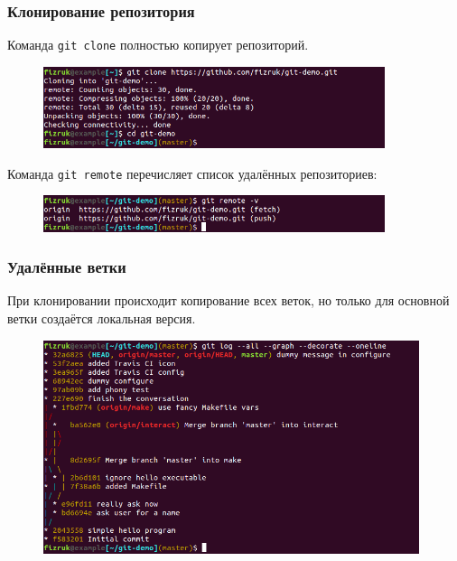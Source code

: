 \documentclass{beamer}
\begin{document}
\begin{frame}
  \frametitle{Клонирование репозитория}
  Команда \texttt{git clone} полностью копирует репозиторий.

  \begin{figure}
    \includegraphics[width=10cm]{images/git-clone.png}
  \end{figure}

  Команда \texttt{git remote} перечисляет список удалённых репозиториев:

  \begin{figure}
    \includegraphics[width=10cm]{images/git-remote.png}
  \end{figure}
\end{frame}

\begin{frame}
  \frametitle{Удалённые ветки}
  При клонировании происходит копирование всех веток, но только для основной
  ветки создаётся локальная версия.

  \begin{figure}
    \includegraphics[width=11cm]{images/git-log-graph.png}
  \end{figure}
\end{frame}
\end{document}
